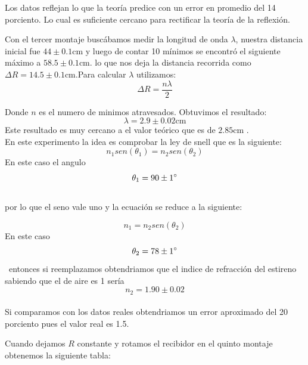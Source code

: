\documentclass[aps,prl,reprint]{revtex4-1}
\begin{document}
Los datos reflejan lo que la teoría predice con un error en promedio del 14 porciento. Lo cual es suficiente cercano para rectificar la teoría de la reflexión.

Con el tercer montaje buscábamos medir la longitud de onda $\lambda$, nuestra distancia inicial fue $44 \pm 0.1 \text{cm}$ y luego de contar 10 m\'inimos se encontró el siguiente máximo a $58.5 \pm 0.1 \text{cm}$. lo que nos deja la distancia recorrida como $\Delta R= 14.5\pm 0.1 \text{cm}$.Para calcular $\lambda$ utilizamos:
\begin{equation}\label{longitudOnda}
    \Delta R=\frac{n\lambda}{2}
\end{equation}

Donde $n$ es el numero de minimos atravesados. Obtuvimos el resultado:
\begin{equation*}
\lambda=2.9\pm 0.02 \text{cm} 
\end{equation*}
Este resultado es muy cercano a el valor teórico que es de $2.85 \text{cm}$ .\\
En este experimento la idea es comprobar la ley de snell que es la siguiente:
\begin{equation}\label{leysnell}
    n_1 sen(\theta_1)= n_2 sen( \theta_2)
\end{equation} 
En este caso el angulo \begin{equation}\label{angulo1}
    \theta_1=90\pm 1\degree
\end{equation} \\  por lo que el seno vale uno y la ecuación se reduce a la siguiente:

\begin{equation}\label{leysnellsimplificada}
    n_1 = n_2 sen( \theta_2)
\end{equation} 
En este caso \begin{equation}\label{angulo}
    \theta_2=78\pm 1\degree
\end{equation} \ entonces si reemplazamos obtendriamos que el indice de refracción del estireno sabiendo que el de aire es 1 sería \begin{equation}\label{angulo}
    n_2=1.90 \pm 0.02
\end{equation}\\ Si comparamos con los datos reales obtendriamos un error aproximado del 20 porciento pues el valor real es 1.5.

Cuando dejamos $R$ constante y rotamos el recibidor en el quinto montaje obtenemos la siguiente tabla:
\end{document}
